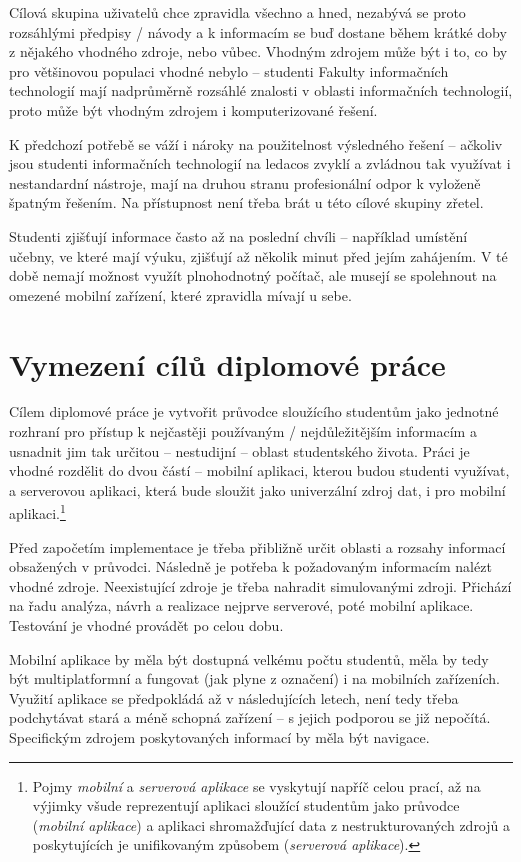Cílová skupina uživatelů chce zpravidla všechno a hned, nezabývá se proto rozsáhlými předpisy / návody a k informacím se buď dostane během krátké doby z nějakého vhodného zdroje, nebo vůbec. Vhodným zdrojem může být i to, co by pro většinovou populaci vhodné nebylo -- studenti Fakulty informačních technologií mají nadprůměrně rozsáhlé znalosti v oblasti informačních technologií, proto může být vhodným zdrojem i komputerizované řešení.

K předchozí potřebě se váží i nároky na použitelnost výsledného řešení -- ačkoliv jsou studenti informačních technologií na ledacos zvyklí a zvládnou tak využívat i nestandardní nástroje, mají na druhou stranu profesionální odpor k vyloženě špatným řešením. Na přístupnost není třeba brát u této cílové skupiny zřetel. 

Studenti zjišťují informace často až na poslední chvíli -- například umístění učebny, ve které mají výuku, zjišťují až několik minut před jejím zahájením. V té době nemají možnost využít plnohodnotný počítač, ale musejí se spolehnout na omezené mobilní zařízení, které zpravidla mívají u sebe.

\section{Vymezení cílů diplomové práce}
Cílem diplomové práce je vytvořit průvodce sloužícího studentům jako jednotné rozhraní pro přístup k nejčastěji používaným / nejdůležitějším informacím a usnadnit jim tak určitou -- nestudijní -- oblast studentského života. Práci je vhodné rozdělit do dvou částí -- mobilní aplikaci, kterou budou studenti využívat, a serverovou aplikaci, která bude sloužit jako univerzální zdroj dat, i pro mobilní aplikaci.\footnote{Pojmy \textit{mobilní} a \textit{serverová aplikace} se vyskytují napříč celou prací, až na výjimky všude reprezentují aplikaci sloužící studentům jako průvodce (\textit{mobilní aplikace}) a aplikaci shromažďující data z nestrukturovaných zdrojů a poskytujících je unifikovaným způsobem (\textit{serverová aplikace}).}

Před započetím implementace je třeba přibližně určit oblasti a rozsahy informací obsažených v průvodci. Následně je potřeba k požadovaným informacím nalézt vhodné zdroje. Neexistující zdroje je třeba nahradit simulovanými zdroji. Přichází na řadu analýza, návrh a realizace nejprve serverové, poté mobilní aplikace. Testování je vhodné provádět po celou dobu.

Mobilní aplikace by měla být dostupná velkému počtu studentů, měla by tedy být multiplatformní a fungovat (jak plyne z označení) i na mobilních zařízeních. Využití aplikace se předpokládá až v následujících letech, není tedy třeba podchytávat stará a méně schopná zařízení -- s jejich podporou se již nepočítá. Specifickým zdrojem poskytovaných informací by měla být navigace.


